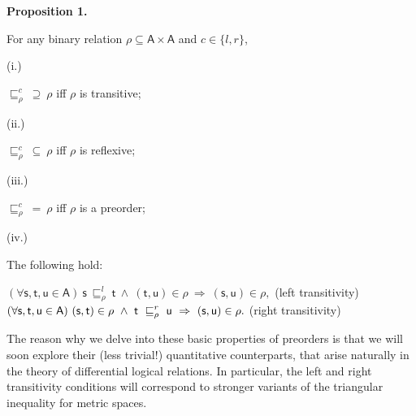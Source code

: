 \documentclass[10pt,a4paper]{amsart}
\begin{document}
 
 
\par\medskip\noindent\textbf{Proposition 1.}\par
 
 
For any binary relation $\rho\subseteq\mathsf{A}\times\mathsf{A}$ and $c\in\{l,r\}$,\par
  
\par\noindent  (i.) 
 
$\sqsubseteq^{c}_{\rho}\ \supseteq\ \rho$ iff $\rho$ is transitive;\par
 
 
 
\par\noindent  (ii.) 
 
$\sqsubseteq^{c}_{\rho}\ \subseteq\ \rho$ iff $\rho$ is reflexive;\par
 
 
 
\par\noindent  (iii.) 
 
$\sqsubseteq^{c}_{\rho}\ =\ \rho$ iff $\rho$ is a preorder;\par
 
 
 
\par\noindent  (iv.) 
 
The following hold:\par
 
 
     $\displaystyle(\forall\mathsf{s},\mathsf{t},\mathsf{u}\in\mathsf{A})\ \mathsf{s%
}\ \sqsubseteq^{l}_{\rho}\ \mathsf{t}\ \land\ (\mathsf{t},\mathsf{u})\in\rho\ %
\Rightarrow\ (\mathsf{s},\mathsf{u})\in\rho,$  (left transitivity)    $\displaystyle(\forall\mathsf{s},\mathsf{t},\mathsf{u}\in\mathsf{A})\ (\mathsf{%
s},\mathsf{t})\in\rho\ \land\ \mathsf{t}\ \sqsubseteq^{r}_{\rho}\ \mathsf{u}\ %
\Rightarrow\ (\mathsf{s},\mathsf{u})\in\rho.$  (right transitivity)   
 
 
 
The reason why we delve into these basic properties of preorders is that we will soon explore their (less trivial!) quantitative counterparts, that arise naturally in the theory of differential logical relations. In particular, the left and right transitivity conditions will correspond to stronger variants of the triangular inequality for metric spaces.\par
 
\end{document}
